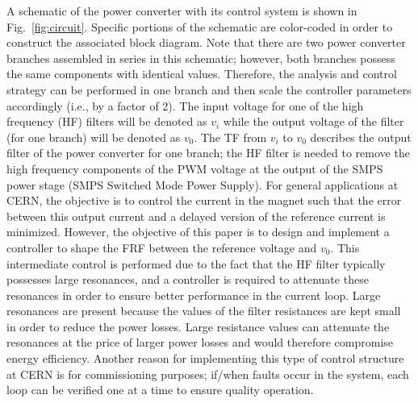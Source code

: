 \documentclass[a4paper, 10pt, conference]{ieeeconf}
\begin{document}
A schematic of the power converter with its control system is shown in Fig.~\ref{fig:circuit}. Specific portions of the schematic are color-coded in order to construct the associated block diagram. Note that there are two power converter branches assembled in series in this schematic; however, both branches possess the same components with identical values. Therefore, the analysis and control strategy can be performed in one branch and then scale the controller parameters accordingly (i.e., by a factor of 2). The input voltage for one of the high frequency (HF) filters will be denoted as $v_i$ while the output voltage of the filter (for one branch) will be denoted as $v_0$. The TF from $v_i$ to $v_0$ describes the output filter of the power converter for one branch; the HF filter is needed to remove the high frequency components of the PWM voltage at the output of the SMPS power stage (SMPS Switched Mode Power Supply). For general applications at CERN, the objective is to control the current in the magnet such that the error between this output current and a delayed version of the reference current is minimized. However, the objective of this paper is to design and implement a controller to shape the FRF between the reference voltage and $v_0$. This intermediate control is performed due to the fact that the HF filter typically possesses large resonances, and a controller is required to attenuate these resonances in order to ensure better performance in the current loop. Large resonances are present because the values of the filter resistances are kept small in order to reduce the power losses. Large resistance values can attenuate the resonances at the price of larger power losses and would therefore compromise energy efficiency. Another reason for implementing this type of control structure at CERN is for commissioning purposes; if/when faults occur in the system, each loop can be verified one at a time to ensure quality operation.
\end{document}
